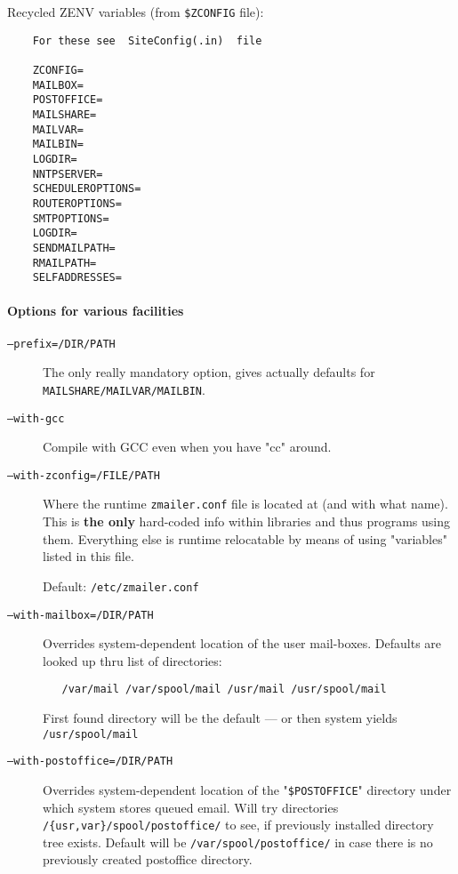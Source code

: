 Recycled ZENV variables (from {\tt \$ZCONFIG} file):
\begin{verbatim}
    For these see  SiteConfig(.in)  file

    ZCONFIG=
    MAILBOX=
    POSTOFFICE=
    MAILSHARE=
    MAILVAR=
    MAILBIN=
    LOGDIR=
    NNTPSERVER=
    SCHEDULEROPTIONS=
    ROUTEROPTIONS=
    SMTPOPTIONS=
    LOGDIR=
    SENDMAILPATH=
    RMAILPATH=
    SELFADDRESSES=
\end{verbatim}

\paragraph{Options for various facilities}

\begin{description}
\item[\tt ---prefix=/DIR/PATH] \mbox{}

The only really mandatory option, gives actually
defaults for \verb:MAILSHARE/MAILVAR/MAILBIN:.

\item[\tt ---with-gcc] \mbox{}

Compile with GCC even when you have "cc" around.

\item[\tt ---with-zconfig=/FILE/PATH] \mbox{}

Where the runtime   {\tt zmailer.conf}   file is located
at (and with what name).  This is {\bf the only} hard-coded
info within libraries and thus programs using them.
Everything else is runtime relocatable by means of using
"variables" listed in this file.

Default: {\tt /etc/zmailer.conf}

\item[\tt ---with-mailbox=/DIR/PATH] \mbox{}

Overrides system-dependent location of the user mail-boxes.
Defaults are looked up thru list of directories:
\begin{verbatim}
   /var/mail /var/spool/mail /usr/mail /usr/spool/mail
\end{verbatim}
First found directory will be the default --- or then
system yields  {\tt /usr/spool/mail}

\item[\tt ---with-postoffice=/DIR/PATH] \mbox{}

Overrides system-dependent location of the "{\tt \$POSTOFFICE}"
directory under which system stores queued email.
Will try directories \verb:/{usr,var}/spool/postoffice/: to
see, if previously installed directory tree exists.
Default will be  \verb:/var/spool/postoffice/:
in case there is no previously created postoffice directory.


\end{description}
